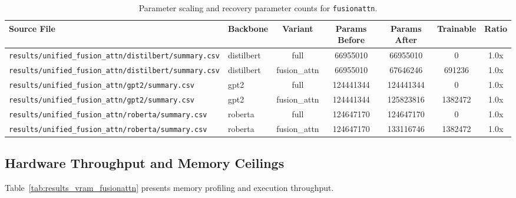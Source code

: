 \begin{table}[t]
\centering
\small
\begin{tabular}{llccccc}
\toprule
\textbf{Source File} & \textbf{Backbone} & \textbf{Variant} & \textbf{Params Before} & \textbf{Params After} & \textbf{Trainable} & \textbf{Ratio} \\
\midrule
\texttt{results/unified\_fusion\_attn/distilbert/summary.csv} & distilbert & full & 66955010 & 66955010 & 0 & 1.0x \\
\texttt{results/unified\_fusion\_attn/distilbert/summary.csv} & distilbert & fusion\_attn & 66955010 & 67646246 & 691236 & 1.0x \\
\texttt{results/unified\_fusion\_attn/gpt2/summary.csv} & gpt2 & full & 124441344 & 124441344 & 0 & 1.0x \\
\texttt{results/unified\_fusion\_attn/gpt2/summary.csv} & gpt2 & fusion\_attn & 124441344 & 125823816 & 1382472 & 1.0x \\
\texttt{results/unified\_fusion\_attn/roberta/summary.csv} & roberta & full & 124647170 & 124647170 & 0 & 1.0x \\
\texttt{results/unified\_fusion\_attn/roberta/summary.csv} & roberta & fusion\_attn & 124647170 & 133116746 & 1382472 & 1.0x \\
\bottomrule
\end{tabular}
\caption{Parameter scaling and recovery parameter counts for \texttt{fusionattn}.}
\label{tab:results_params_fusionattn}
\end{table}

\subsection{Hardware Throughput and Memory Ceilings}
Table~\ref{tab:results_vram_fusionattn} presents memory profiling and execution throughput.

